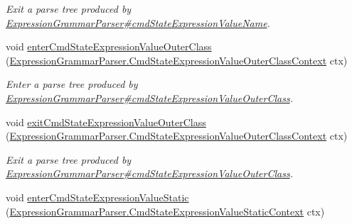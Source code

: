 \begin{DoxyCompactItemize}
\begin{DoxyCompactList}\small\item\em Exit a parse tree produced by \hyperlink{classgov_1_1nasa_1_1jpf_1_1inspector_1_1server_1_1expression_1_1parser_1_1_expression_grammar_parser_ab7b7d7ff1d67db1969528b9cb4557d4e}{Expression\+Grammar\+Parser\#cmd\+State\+Expression\+Value\+Name}. \end{DoxyCompactList}\item 
void \hyperlink{interfacegov_1_1nasa_1_1jpf_1_1inspector_1_1server_1_1expression_1_1parser_1_1_expression_grammar_listener_ae76bfe6b8a2b29de73113521a8381c77}{enter\+Cmd\+State\+Expression\+Value\+Outer\+Class} (\hyperlink{classgov_1_1nasa_1_1jpf_1_1inspector_1_1server_1_1expression_1_1parser_1_1_expression_grammar_paa97aac802c11881ff9166c765f4fc61a}{Expression\+Grammar\+Parser.\+Cmd\+State\+Expression\+Value\+Outer\+Class\+Context} ctx)
\begin{DoxyCompactList}\small\item\em Enter a parse tree produced by \hyperlink{classgov_1_1nasa_1_1jpf_1_1inspector_1_1server_1_1expression_1_1parser_1_1_expression_grammar_parser_a3cb4602fb37c47251dc62b7e1d7c9f0c}{Expression\+Grammar\+Parser\#cmd\+State\+Expression\+Value\+Outer\+Class}. \end{DoxyCompactList}\item 
void \hyperlink{interfacegov_1_1nasa_1_1jpf_1_1inspector_1_1server_1_1expression_1_1parser_1_1_expression_grammar_listener_a5be0a898500f96b74985f629fc398995}{exit\+Cmd\+State\+Expression\+Value\+Outer\+Class} (\hyperlink{classgov_1_1nasa_1_1jpf_1_1inspector_1_1server_1_1expression_1_1parser_1_1_expression_grammar_paa97aac802c11881ff9166c765f4fc61a}{Expression\+Grammar\+Parser.\+Cmd\+State\+Expression\+Value\+Outer\+Class\+Context} ctx)
\begin{DoxyCompactList}\small\item\em Exit a parse tree produced by \hyperlink{classgov_1_1nasa_1_1jpf_1_1inspector_1_1server_1_1expression_1_1parser_1_1_expression_grammar_parser_a3cb4602fb37c47251dc62b7e1d7c9f0c}{Expression\+Grammar\+Parser\#cmd\+State\+Expression\+Value\+Outer\+Class}. \end{DoxyCompactList}\item 
void \hyperlink{interfacegov_1_1nasa_1_1jpf_1_1inspector_1_1server_1_1expression_1_1parser_1_1_expression_grammar_listener_af700b345a4637ffc8eb3879a8d37f165}{enter\+Cmd\+State\+Expression\+Value\+Static} (\hyperlink{classgov_1_1nasa_1_1jpf_1_1inspector_1_1server_1_1expression_1_1parser_1_1_expression_grammar_pa08e6165e66cacb4d3382a343315ee767}{Expression\+Grammar\+Parser.\+Cmd\+State\+Expression\+Value\+Static\+Context} ctx)

\end{DoxyCompactItemize}
